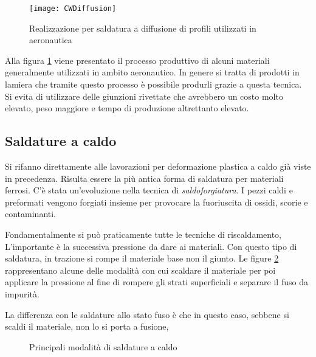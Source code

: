 \begin{figure}
\centering
\texttt{[image: CWDiffusion]}
\caption{Realizzazione per saldatura a diffusione di profili utilizzati in aeronautica}
\label{fig:CWDIffusion}
\end{figure}

Alla figura \ref{fig:CWDIffusion} viene presentato il processo produttivo di alcuni materiali generalmente utilizzati in ambito aeronautico. In genere si tratta di prodotti in lamiera che tramite questo processo è possibile produrli grazie a questa tecnica.
Si evita di utilizzare delle giunzioni rivettate che avrebbero un costo molto elevato, peso maggiore e tempo di produzione altrettanto elevato.

\subsection{Saldature a caldo}
Si rifanno direttamente alle lavorazioni per deformazione plastica a caldo già viste in precedenza.
Risulta essere la più antica forma di saldatura per materiali ferrosi.
C'è stata un'evoluzione nella tecnica di \emph{saldoforgiatura}.
I pezzi caldi e preformati vengono forgiati insieme per provocare la fuoriuscita di ossidi, scorie e contaminanti.

Fondamentalmente si può praticamente tutte le tecniche di riscaldamento, L'importante è la successiva pressione da dare ai materiali.
Con questo tipo di saldatura, in trazione si rompe il materiale base non il giunto.
Le figure \ref{fig:SaldaturaACaldo} rappresentano alcune delle modalità con cui scaldare il materiale per poi applicare la pressione al fine di rompere gli strati superficiali e separare il fuso da impurità.

La differenza con le saldature allo stato fuso è che in questo caso, sebbene si scaldi il materiale, non lo si porta a fusione,

\begin{figure}
\centering
{}\quad
{}\quad
{}
\caption{Principali modalità di saldature a caldo}
\label{fig:SaldaturaACaldo}
\end{figure}

